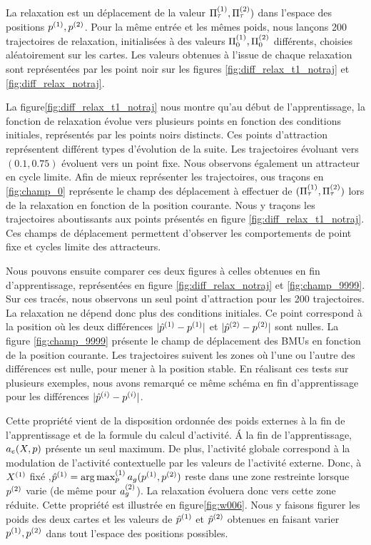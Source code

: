 \documentclass[../main]{subfiles}
\begin{document}
La relaxation est un déplacement de la valeur $\Pi^{({1})}_\tau, \Pi^{({2})}_\tau)$ dans l'espace des positions $p^{({1})}, p^{({2})}$. 
Pour la même entrée et les mêmes poids, nous lançons 200 trajectoires de relaxation, initialisées à des valeurs $\Pi^{({1})}_0,\Pi^{({2})}_0$ différents, choisies aléatoirement sur les cartes.
Les valeurs obtenues à l'issue de chaque relaxation sont représentées par les point noir sur les figures \ref{fig:diff_relax_t1_notraj} et \ref{fig:diff_relax_notraj}.

La figure\ref{fig:diff_relax_t1_notraj} nous montre qu'au début de l'apprentissage, la fonction de relaxation évolue vers plusieurs points en fonction des conditions initiales, représentés par les points noirs distincts. 
Ces points d'attraction représentent différent types d'évolution de la suite. Les trajectoires évoluant vers $(0.1, 0.75)$ évoluent vers un point fixe. Nous observons également un attracteur en cycle limite.
Afin de mieux représenter les trajectoires, ous traçons en \ref{fig:champ_0} représente le champ des déplacement à effectuer de $(\Pi^{({1})}_\tau,\Pi^{({2})}_\tau)$ lors de la relaxation en fonction de la position courante. 
Nous y traçons les trajectoires aboutissants aux points présentés en figure \ref{fig:diff_relax_t1_notraj}.
Ces champs de déplacement permettent d'observer les comportements de point fixe et cycles limite des attracteurs.

Nous pouvons ensuite comparer ces deux figures à celles obtenues en fin d'apprentissage, représentées en figure \ref{fig:diff_relax_notraj} et \ref{fig:champ_9999}.
Sur ces tracés, nous observons un seul point d'attraction pour les 200 trajectoires. La relaxation ne dépend donc plus des conditions initiales.
Ce point correspond à la position où les deux différences $\lvert \hat{p}^{({1})} - p^{({1})} \rvert$ et $\lvert \hat{p}^{({2})} - p^{({2})}\rvert$ sont nulles.
La figure \ref{fig:champ_9999} présente le champ de déplacement des BMUs en fonction de la position courante. Les trajectoires suivent les zones où l'une ou l'autre des différences est nulle, pour mener à la position stable. 
En réalisant ces tests sur plusieurs exemples, nous avons remarqué ce  même schéma en fin d'apprentissage pour les différences $\lvert \hat{p}^{({i})} - p^{({i})} \rvert$.

Cette propriété vient de la disposition ordonnée des poids externes à la fin de l'apprentissage et de la formule du calcul d'activité.
\'A la fin de l'apprentissage, $a_e(X,p)$ présente un seul maximum. 
De plus, l'activité globale correspond à la modulation de l'activité contextuelle par les valeurs de l'activité externe. Donc, à $X^{({1})}$ fixé ,$\hat{p}^{({1})} = \operatorname*{arg\,max}_p^{({1})} a_g(p^{({1})}, p^{({2})})$ reste dans une zone restreinte lorsque $p^{({2})}$ varie (de même pour $a_g^{({2})}$). 
La relaxation évoluera donc vers cette zone réduite.
Cette propriété est illustrée en figure\ref{fig:w006}.
Nous y faisons figurer les poids des deux cartes et les valeurs de $\hat{p}^{({1})}$ et $\hat{p}^{({2})}$ obtenues en faisant varier $p^{({1})}, p^{({2})}$ dans tout l'espace des positions possibles.
\end{document}
